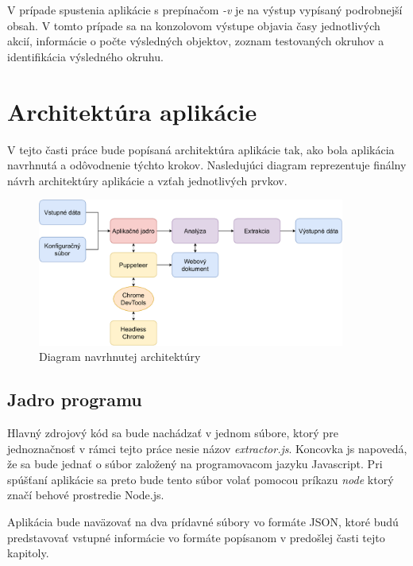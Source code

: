 V prípade spustenia aplikácie s prepínačom \textit{-v} je na výstup vypísaný podrobnejší obsah. V tomto prípade sa na konzolovom výstupe objavia časy jednotlivých akcií, informácie o počte výsledných objektov, zoznam testovaných okruhov a identifikácia výsledného okruhu.

\section{Architektúra aplikácie}

V tejto časti práce bude popísaná architektúra aplikácie tak, ako bola aplikácia navrhnutá a odôvodnenie týchto krokov. Nasledujúci diagram reprezentuje finálny návrh architektúry aplikácie a vzťah jednotlivých prvkov.

\bigskip

\begin{figure}[hbt]
	\centering
	\includegraphics[width=0.9\textwidth]{obrazky-figures/architecture.pdf}
	\caption{Diagram navrhnutej architektúry}
	\label{architecture}
\end{figure}

\bigskip

\subsection{Jadro programu}

Hlavný zdrojový kód sa bude nachádzať v jednom súbore, ktorý pre jednoznačnosť v rámci tejto práce nesie názov \textit{extractor.js}. Koncovka js napovedá, že sa bude jednať o súbor založený na programovacom jazyku Javascript. Pri spúšťaní aplikácie sa preto bude tento súbor volať pomocou príkazu \textit{node} ktorý značí behové prostredie Node.js.

Aplikácia bude naväzovať na dva prídavné súbory vo formáte JSON, ktoré budú predstavovať vstupné informácie vo formáte popísanom v predošlej časti tejto kapitoly. 

